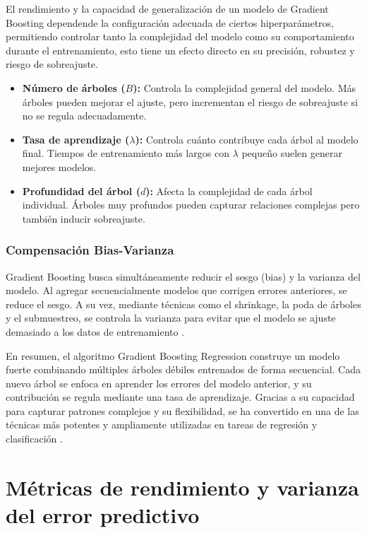 El rendimiento y la capacidad de generalización de un modelo de Gradient Boosting dependende la configuración adecuada de ciertos hiperparámetros, permitiendo controlar tanto la complejidad del modelo como su comportamiento durante el entrenamiento, esto tiene un efecto directo en su precisión, robustez y riesgo de sobreajuste.

\begin{itemize}
	\item \textbf{Número de árboles ($B$):} Controla la complejidad general del modelo. Más árboles pueden mejorar el ajuste, pero incrementan el riesgo de sobreajuste si no se regula adecuadamente.
	\item \textbf{Tasa de aprendizaje ($\lambda$):} Controla cuánto contribuye cada árbol al modelo final. Tiempos de entrenamiento más largos con $\lambda$ pequeño suelen generar mejores modelos.
	\item \textbf{Profundidad del árbol ($d$):} Afecta la complejidad de cada árbol individual. Árboles muy profundos pueden capturar relaciones complejas pero también inducir sobreajuste.
\end{itemize}

\subsubsection{Compensación Bias-Varianza}

Gradient Boosting busca simultáneamente reducir el sesgo (bias) y la varianza del modelo. Al agregar secuencialmente modelos que corrigen errores anteriores, se reduce el sesgo. A su vez, mediante técnicas como el shrinkage, la poda de árboles y el submuestreo, se controla la varianza para evitar que el modelo se ajuste demasiado a los datos de entrenamiento \citep{james2013}.

\bigskip

En resumen, el algoritmo Gradient Boosting Regression construye un modelo fuerte combinando múltiples árboles débiles entrenados de forma secuencial. Cada nuevo árbol se enfoca en aprender los errores del modelo anterior, y su contribución se regula mediante una tasa de aprendizaje. Gracias a su capacidad para capturar patrones complejos y su flexibilidad, se ha convertido en una de las técnicas más potentes y ampliamente utilizadas en tareas de regresión y clasificación \citep{james2013, veirana2021, hastie2009, friedman2001}.


\section{Métricas de rendimiento y varianza del error predictivo }


